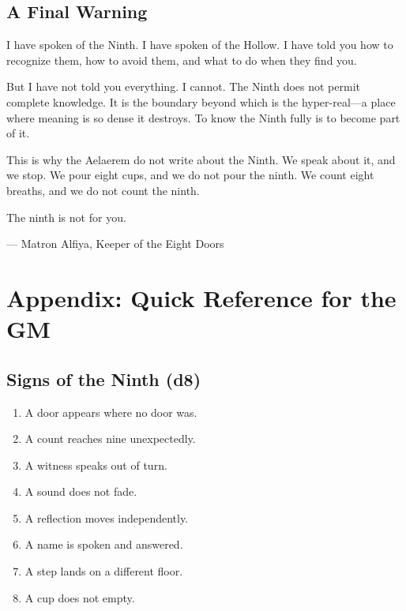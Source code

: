 \documentclass[11pt]{book}
\begin{document}
\section*{A Final Warning}

I have spoken of the Ninth. I have spoken of the Hollow. I have told you how to recognize them, how to avoid them, and what to do when they find you.

But I have not told you everything. I cannot. The Ninth does not permit complete knowledge. It is the boundary beyond which is the hyper-real---a place where meaning is so dense it destroys. To know the Ninth fully is to become part of it.

This is why the Aelaerem do not write about the Ninth. We speak about it, and we stop. We pour eight cups, and we do not pour the ninth. We count eight breaths, and we do not count the ninth.

The ninth is not for you.

\begin{flushright}
--- Matron Alfiya, Keeper of the Eight Doors
\end{flushright}

\appendix

\chapter*{Appendix: Quick Reference for the GM}

\section*{Signs of the Ninth (d8)}
\begin{enumerate}
  \item A door appears where no door was.
  \item A count reaches nine unexpectedly.
  \item A witness speaks out of turn.
  \item A sound does not fade.
  \item A reflection moves independently.
  \item A name is spoken and answered.
  \item A step lands on a different floor.
  \item A cup does not empty.
\end{enumerate}
\end{document}

